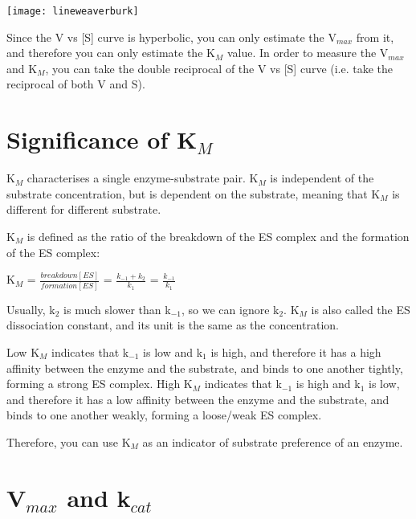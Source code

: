 \documentclass[a4paper, 12pt]{report}
\begin{document}
\begin{center}
\texttt{[image: lineweaverburk]}
\end{center}

Since the V vs [S] curve is hyperbolic, you can only estimate the V$_{max}$ from it, and therefore you can only estimate the K$_M$ value.
In order to measure the V$_{max}$ and K$_M$, you can take the double reciprocal of the V vs [S] curve (i.e. take the reciprocal of both V and S).

\section{Significance of K$_M$}

\begin{center}
\end{center}

K$_M$ characterises a single enzyme-substrate pair.
K$_M$ is independent of the substrate concentration, but is dependent on the substrate, meaning that K$_M$ is different for different substrate.

K$_M$ is defined as the ratio of the breakdown of the ES complex and the formation of the ES complex:

\begin{center}
\large{K$_M$ = $\frac{breakdown[ES]}{formation[ES]}$ = $\frac{k_{-1} + k_2}{k_1}$ = $\frac{k_{-1}}{k_1}$}
\end{center}

Usually, k$_2$ is much slower than k$_{-1}$, so we can ignore k$_2$.
K$_M$ is also called the ES dissociation constant, and its unit is the same as the concentration.

Low K$_M$ indicates that k$_{-1}$ is low and k$_1$ is high, and therefore it has a high affinity between the enzyme and the substrate, and binds to one another tightly, forming a strong ES complex.
High K$_M$ indicates that k$_{-1}$ is high and k$_1$ is low, and therefore it has a low affinity between the enzyme and the substrate, and binds to one another weakly, forming a loose/weak ES complex.

Therefore, you can use K$_M$ as an indicator of substrate preference of an enzyme.

\section{V$_{max}$ and k$_{cat}$}
\end{document}
